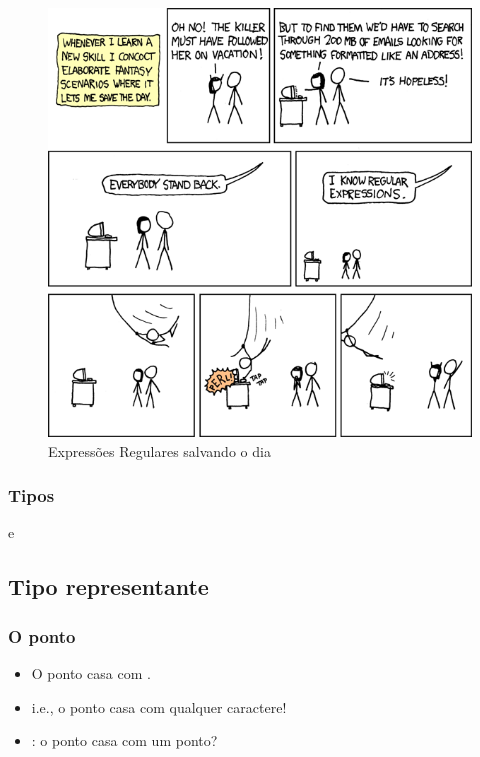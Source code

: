 \begin{frame}
	\begin{figure}
		\centering
			\includegraphics[height=0.8\textheight]{imagens/re/regular_expressions.png}
		\caption{Expressões Regulares salvando o dia}
	\end{figure}

\end{frame}

\begin{frame}
	\frametitle{Tipos}
	\Large{ e }
\end{frame}

\subsection{Tipo representante}


\begin{frame}
	\frametitle{O ponto}
	\begin{itemize}
		\item \Large{O ponto casa com .}
		\item i.e., o ponto casa com qualquer caractere!
		\item {}: o ponto casa com um ponto?
	\end{itemize}
\end{frame}


